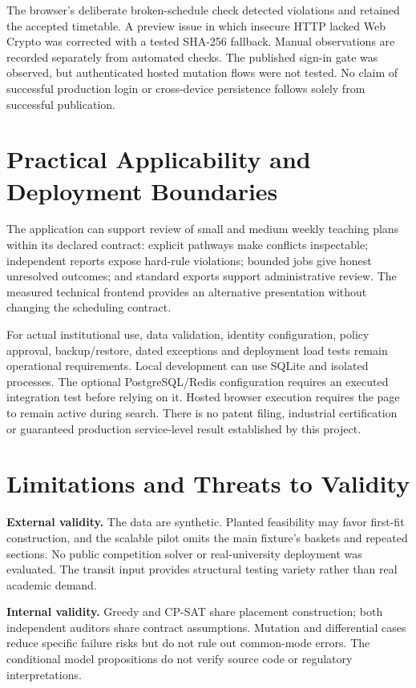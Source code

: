 \documentclass[pdflatex,sn-mathphys-num]{sn-jnl}
\theoremstyle{thmstyleone}
\theoremstyle{thmstyletwo}
\theoremstyle{thmstylethree}
\begin{document}
The browser's deliberate broken-schedule check detected violations and retained the accepted timetable. A preview issue in which insecure HTTP lacked Web Crypto was corrected with a tested SHA-256 fallback. Manual observations are recorded separately from automated checks. The published sign-in gate was observed, but authenticated hosted mutation flows were not tested. No claim of successful production login or cross-device persistence follows solely from successful publication.

\section{Practical Applicability and Deployment Boundaries}\label{sec:practical}

The application can support review of small and medium weekly teaching plans within its declared contract: explicit pathways make conflicts inspectable; independent reports expose hard-rule violations; bounded jobs give honest unresolved outcomes; and standard exports support administrative review. The measured technical frontend provides an alternative presentation without changing the scheduling contract.

For actual institutional use, data validation, identity configuration, policy approval, backup/restore, dated exceptions and deployment load tests remain operational requirements. Local development can use SQLite and isolated processes. The optional PostgreSQL/Redis configuration requires an executed integration test before relying on it. Hosted browser execution requires the page to remain active during search. There is no patent filing, industrial certification or guaranteed production service-level result established by this project.

\section{Limitations and Threats to Validity}\label{sec:limits}

\textbf{External validity.} The data are synthetic. Planted feasibility may favor first-fit construction, and the scalable pilot omits the main fixture's baskets and repeated sections. No public competition solver or real-university deployment was evaluated. The transit input provides structural testing variety rather than real academic demand.

\textbf{Internal validity.} Greedy and CP-SAT share placement construction; both independent auditors share contract assumptions. Mutation and differential cases reduce specific failure risks but do not rule out common-mode errors. The conditional model propositions do not verify source code or regulatory interpretations.
\end{document}
